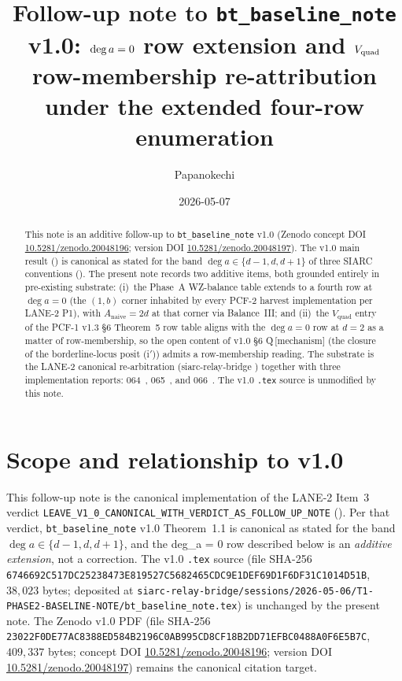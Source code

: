 \documentclass[11pt,reqno]{amsart}
\title[Follow-up note to bt\_baseline\_note v1.0]
      {Follow-up note to \texttt{bt\_baseline\_note} v1.0:
       $\dega = 0$ row extension and $\Vquad$ row-membership
       re-attribution under the extended four-row enumeration}
\author{Papanokechi}
\date{2026-05-07}
\theoremstyle{plain}
\theoremstyle{definition}
\theoremstyle{remark}
\newcommand{\Anaive}{A_{\mathrm{naive}}}
\newcommand{\dega}{\deg a}
\newcommand{\Vquad}{V_{\mathrm{quad}}}
\begin{document}
\maketitle

\begin{abstract}
This note is an additive follow-up to \texttt{bt\_baseline\_note}
v1.0 (Zenodo concept DOI
\href{https://doi.org/10.5281/zenodo.20048196}{10.5281/zenodo.20048196};
version DOI
\href{https://doi.org/10.5281/zenodo.20048197}{10.5281/zenodo.20048197}).
The v1.0 main result (\cite[Theorem~1.1]{bt_baseline_note_v10})
is canonical as stated for the band $\dega \in \{d-1, d, d+1\}$
of three SIARC conventions (\cite[\S 2.2 -- \S 2.3]%
{bt_baseline_note_v10}). The present note records two
additive items, both grounded entirely in pre-existing
substrate: (i)~the Phase~A WZ-balance table extends to a fourth
row at $\dega = 0$ (the $(1, b)$ corner inhabited by every
PCF-2 harvest implementation per LANE-2 P1), with
$\Anaive = 2d$ at that corner via Balance~III; and
(ii)~the $\Vquad$ entry of the PCF-1 v1.3 \S 6 Theorem~5 row
table aligns with the $\dega = 0$ row at $d = 2$ as a matter of
row-membership, so the open content of v1.0 \S 6
Q\,[mechanism] (the closure of the borderline-locus posit
\textup{(i$'$)}) admits a row-membership reading. The substrate
is the LANE-2 canonical re-arbitration
(siarc-relay-bridge \cite{lane2_dee3c01}) together with three
implementation reports: 064~\cite{phase_a_deg_a_zero_064},
065~\cite{cf_value_audit_pcf2_9impls_065}, and
066~\cite{pcf1_v13_v_quad_row_reframing_066}. The
v1.0 \texttt{.tex} source is unmodified by this note.
\end{abstract}

\section{Scope and relationship to v1.0}
\label{sec:scope}

This follow-up note is the canonical implementation of the
LANE-2 Item~3 verdict
\texttt{LEAVE\_V1\_0\_CANONICAL\_WITH\_VERDICT\_AS\_FOLLOW\_UP\_NOTE}
(\cite[Item~3 reasoning, L173--200]{lane2_six_item_verdict}).
Per that verdict, \texttt{bt\_baseline\_note} v1.0
Theorem~1.1 is canonical as stated for the band
$\dega \in \{d-1, d, d+1\}$, and the deg\_a = 0 row described
below is an \emph{additive extension}, not a correction. The
v1.0 \texttt{.tex} source (file SHA-256
\verb|6746692C517DC25238473E819527C5682465CDC9E1DEF69D1F6DF31C1014D51B|,
$38{,}023$ bytes; deposited at
\texttt{siarc-relay-bridge/sessions/2026-05-06/T1-PHASE2-BASELINE-NOTE/bt\_baseline\_note.tex})
is unchanged by the present note. The Zenodo v1.0 PDF
(file SHA-256
\verb|23022F0DE77AC8388ED584B2196C0AB995CD8CF18B2DD71EFBC0488A0F6E5B7C|,
$409{,}337$ bytes; concept DOI
\href{https://doi.org/10.5281/zenodo.20048196}{10.5281/zenodo.20048196};
version DOI
\href{https://doi.org/10.5281/zenodo.20048197}{10.5281/zenodo.20048197})
remains the canonical citation target.
\end{document}
